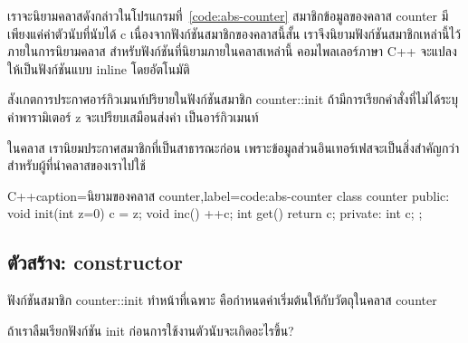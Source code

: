 เรา{\wbr}จะ{\wbr}นิยาม{\wbr}ค{\wbr}ลา{\wbr}ส{\wbr}ดังกล่าว{\wbr}ใน{\wbr}โปรแกรม{\wbr}ที่~\ref{code:abs-counter} สมาชิก{\wbr}ข้อมูล{\wbr}ของ{\wbr}ค{\wbr}ลา{\wbr}ส
{\ct counter} มี{\wbr}เพียงแค่{\wbr}ค่าตัว{\wbr}นับ{\wbr}ที่{\wbr}นับ{\wbr}ได้ {\ct c} เนื่องจาก{\wbr}ฟังก์ชัน{\wbr}สมาชิก{\wbr}ของ{\wbr}ค{\wbr}ลา{\wbr}ส{\wbr}นี้{\wbr}สั้น{\wbr}
เรา{\wbr}จึง{\wbr}นิยาม{\wbr}ฟังก์ชัน{\wbr}สมาชิก{\wbr}เหล่านี้{\wbr}ไว้{\wbr}ภายใน{\wbr}การ{\wbr}นิยาม{\wbr}ค{\wbr}ลา{\wbr}ส
สำหรับ{\wbr}ฟังก์ชัน{\wbr}ที่{\wbr}นิยาม{\wbr}ภายใน{\wbr}ค{\wbr}ลา{\wbr}ส{\wbr}เหล่านี้ คอม{\wbr}ไพล{\wbr}เลอร์{\wbr}ภาษา C++ จะ{\wbr}แปลง{\wbr}ให้{\wbr}เป็น{\wbr}ฟังก์ชัน{\wbr}แบบ{\wbr}
inline โดย{\wbr}อัตโนมัติ{\wbr}

สังเกต{\wbr}การ{\wbr}ประกาศ{\wbr}อาร์กิวเมนท์{\wbr}ปริยาย{\wbr}ใน{\wbr}ฟังก์ชัน{\wbr}สมาชิก {\ct counter::init}
ถ้า{\wbr}มี{\wbr}การ{\wbr}เรียก{\wbr}คำสั่ง{\wbr}ที่{\wbr}ไม่{\wbr}ได้{\wbr}ระบุ{\wbr}ค่า{\wbr}พารามิเตอร์ {\ct z} จะ{\wbr}เปรียบ{\wbr}เสมือน{\wbr}ส่ง{\wbr}ค่า {}
เป็น{\wbr}อาร์กิวเมนท์  

ใน{\wbr}ค{\wbr}ลา{\wbr}ส เรา{\wbr}นิยม{\wbr}ประกาศ{\wbr}สมาชิก{\wbr}ที่{\wbr}เป็น{\wbr}สาธารณะ{\wbr}ก่อน{\wbr}
เพราะ{\wbr}ข้อมูล{\wbr}ส่วน{\wbr}อิน{\wbr}เทอร์เฟส{\wbr}จะ{\wbr}เป็น{\wbr}สิ่ง{\wbr}สำคัญ{\wbr}กว่า{\wbr}สำหรับ{\wbr}ผู้{\wbr}ที่{\wbr}นำ{\wbr}ค{\wbr}ลา{\wbr}ส{\wbr}ของ{\wbr}เรา{\wbr}ไป{\wbr}ใช้{\wbr}

\latintext
\begin{codelist}{C++}{caption={\thaitext นิยาม{\wbr}ของ{\wbr}ค{\wbr}ลา{\wbr}ส {\ct counter}\latintext},label=code:abs-counter}
class counter {
public:
  void init(int z=0) { c = z; }
  void inc() { ++c; }
  int get() { return c; }
private:
  int c;
};
\end{codelist}
\thaitext

\subsection{ตัว{\wbr}สร้าง: constructor}
ฟังก์ชัน{\wbr}สมาชิก {\ct counter::init} ทำ{\wbr}หน้าที่{\wbr}เฉพาะ คือ{\wbr}กำหนด{\wbr}ค่า{\wbr}เริ่มต้น{\wbr}ให้{\wbr}กับ{\wbr}วัตถุ{\wbr}ใน{\wbr}ค{\wbr}ลา{\wbr}ส
{\ct counter}

\begin{quiz}{}
ถ้า{\wbr}เรา{\wbr}ลืม{\wbr}เรียก{\wbr}ฟังก์ชัน {\ct init} ก่อน{\wbr}การ{\wbr}ใช้{\wbr}งาน{\wbr}ตัว{\wbr}นับ{\wbr}จะ{\wbr}เกิด{\wbr}อะไร{\wbr}ขึ้น?
\end{quiz}

